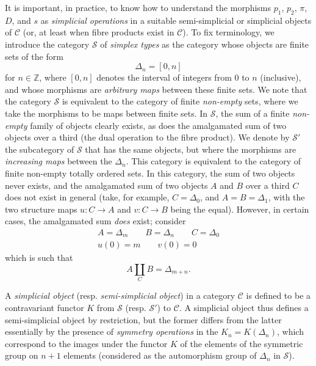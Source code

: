\documentclass{article}
\renewcommand{\cal}[1]{{\mathcal{#1}}}
\newcommand{\oldpage}[1]{\marginpar{\footnotesize$\Big\vert$ \textit{p.~#1}}}
\begin{document}
It is important, in practice, to know how to understand the morphisms $p_1$, $p_2$, $\pi$, $D$, and $s$ as \emph{simplicial operations} in a suitable semi-simplicial or simplicial objects of $\cal{C}$ (or, at least when fibre products exist in $\cal{C}$).
To fix terminology, we introduce the category $\cal{S}$ of \emph{simplex types} as the category whose objects are finite sets of the form
\[
  \Delta_n = [0,n]
\]
for $n\in\mathbb{Z}$, where $[0,n]$ denotes the interval of integers from $0$ to $n$ (inclusive), and whose morphisms are \emph{arbitrary maps} between these finite sets.
We note that the category $\cal{S}$ is equivalent to the category of finite \emph{non-empty} sets, where we take the morphisms to be maps between finite sets.
In $\cal{S}$, the sum of a finite \emph{non-empty} family of objects clearly exists, as does the amalgamated sum of two objects over a third (the dual operation to the fibre product).
We denote by $\cal{S}'$ the subcategory of $\cal{S}$ that has the same objects, but where the morphisms are \emph{increasing maps} between the $\Delta_n$.
This category is equivalent to the category of finite non-empty totally ordered sets.
In this category, the
\oldpage{212-10}
sum of two objects never exists, and the amalgamated sum of two objects $A$ and $B$ over a third $C$ does not exist in general (take, for example, $C=\Delta_0$, and $A=B=\Delta_1$, with the two structure maps $u\colon C\to A$ and $v\colon C\to B$ being the equal).
However, in certain cases, the amalgamated sum \emph{does} exist;
consider
\[
  \begin{gathered}
    A = \Delta_m
    \qquad B = \Delta_n
    \qquad C = \Delta_0
  \\u(0) = m
    \qquad v(0) = 0
  \end{gathered}
\]
which is such that
\[
  A\coprod_C B = \Delta_{m+n}.
\]

A \emph{simplicial object} (resp. \emph{semi-simplicial object}) in a category $\cal{C}$ is defined to be a contravariant functor $K$ from $\cal{S}$ (resp. $\cal{S}'$) to $\cal{C}$.
A simplicial object thus defines a semi-simplicial object by restriction, but the former differs from the latter essentially by the presence of \emph{symmetry operations} in the $K_n=K(\Delta_n)$, which correspond to the images under the functor $K$ of the elements of the symmetric group on $n+1$ elements (considered as the automorphism group of $\Delta_n$ in $\cal{S}$).
\end{document}
